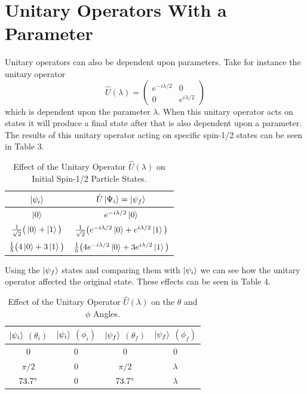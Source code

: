\documentclass[twocolumn]{article}
\begin{document}
\section*{Unitary Operators With a Parameter}
Unitary operators can also be dependent upon parameters. Take for instance the unitary operator
\begin{equation}\label{eq:17}
\hat{U}(\lambda)=
\begin{pmatrix}
e^{-i\lambda/2} & 0 \\
0 & e^{i\lambda/2}
\end{pmatrix}
\end{equation}
which is dependent upon the parameter $\lambda$. When this unitary operator acts on states it will produce a final state after that is also dependent upon a parameter. The results of this unitary operator acting on specific spin-1/2 states can be seen in Table 3. \\
\newpage
\begin{table}[h!]
\begin{center}
\begin{tabular}{ |c|c| }
\hline $\ket{\psi_i}$& $\hat{U}\ket{\Psi_i}=\ket{\psi_f}$ \\
\hline $\ket{0}$& $e^{-i\lambda/2}\ket{0}$\\
\hline $\frac{1}{\sqrt{2}}\big(\ket{0}+\ket{1}\big)$& $\frac{1}{\sqrt{2}}\big(e^{-i\lambda/2}\ket{0}+e^{i\lambda/2}\ket{1}\big)$\\
\hline $\frac{1}{5}\big(4\ket{0}+3\ket{1}\big)$& $\frac{1}{5}\big(4e^{-i\lambda/2}\ket{0}+3e^{i\lambda/2}\ket{1}\big)$\\
\hline
\end{tabular}
\caption{Effect of the Unitary Operator $\hat{U}(\lambda)$ on Initial Spin-1/2 Particle States.}
\end{center}
\end{table} 
Using the $\ket{\psi_f}$ states and comparing them with $\ket{\psi_i}$ we can see how the unitary operator affected the original state. These effects can be seen in Table 4.
\begin{table}[h!]
\begin{center}
\begin{tabular}{ |c|c|c|c| }
\hline $\ket{\psi_i}$ $(\theta_i)$& $\ket{\psi_i}$ $(\phi_i)$& $\ket{\psi_f}$ $(\theta_f)$& $\ket{\psi_f}$ $(\phi_f)$ \\
\hline 0 & 0 & 0 & 0 \\
\hline $\pi/2$ & 0 & $\pi/2$ & $\lambda$ \\
\hline $73.7\degree$ & $0$ & $73.7\degree$ & $\lambda$ \\
\hline
\end{tabular}
\caption{Effect of the Unitary Operator $\hat{U}(\lambda)$ on the $\theta$ and $\phi$ Angles.}
\end{center}
\end{table} \\
\end{document}
